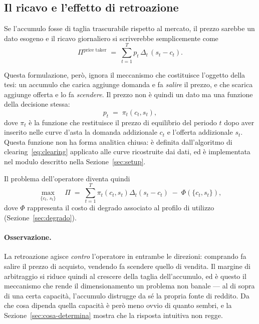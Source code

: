 \subsection*{Il ricavo e l'effetto di retroazione}

Se l'accumulo fosse di taglia trascurabile rispetto al mercato, il prezzo sarebbe un dato
esogeno e il ricavo giornaliero si scriverebbe semplicemente come
\begin{equation}
\Pi^{\text{price taker}} \;=\; \sum_{t=1}^{T} p_t \,\Delta_t \,(s_t - c_t).
\label{eq:ricavo-pricetaker}
\end{equation}

Questa formulazione, per\`o, ignora il meccanismo che costituisce l'oggetto della tesi: un
accumulo che carica aggiunge domanda e fa \emph{salire} il prezzo, e che scarica aggiunge
offerta e lo fa \emph{scendere}. Il prezzo non \`e quindi un dato ma una funzione della
decisione stessa:
\begin{equation}
p_t \;=\; \pi_t\!\left(c_t, s_t\right),
\label{eq:prezzo-endogeno}
\end{equation}
dove $\pi_t$ \`e la funzione che restituisce il prezzo di equilibrio del periodo $t$ dopo
aver inserito nelle curve d'asta la domanda addizionale $c_t$ e l'offerta addizionale $s_t$.
Questa funzione non ha forma analitica chiusa: \`e definita dall'algoritmo di
clearing~\eqref{eq:clearing} applicato alle curve ricostruite dai dati, ed \`e implementata
nel modulo descritto nella Sezione~\ref{sec:setup}.

Il problema dell'operatore diventa quindi
\begin{equation}
\max_{\{c_t,\, s_t\}} \quad
\Pi \;=\; \sum_{t=1}^{T} \pi_t\!\left(c_t, s_t\right) \Delta_t \left(s_t - c_t\right)
\;-\; \Phi\!\left(\{c_t, s_t\}\right),
\label{eq:obiettivo}
\end{equation}
dove $\Phi$ rappresenta il costo di degrado associato al profilo di utilizzo
(Sezione~\ref{sec:degrado}).

\paragraph{Osservazione.} La retroazione agisce \emph{contro} l'operatore in entrambe le
direzioni: comprando fa salire il prezzo di acquisto, vendendo fa scendere quello di vendita.
Il margine di arbitraggio si riduce quindi al crescere della taglia dell'accumulo, ed \`e
questo il meccanismo che rende il dimensionamento un problema non banale — al di sopra di una
certa capacit\`a, l'accumulo distrugge da s\'e la propria fonte di reddito. Da che cosa
dipenda quella capacit\`a \`e per\`o meno ovvio di quanto sembri, e la
Sezione~\ref{sec:cosa-determina} mostra che la risposta intuitiva non regge.

